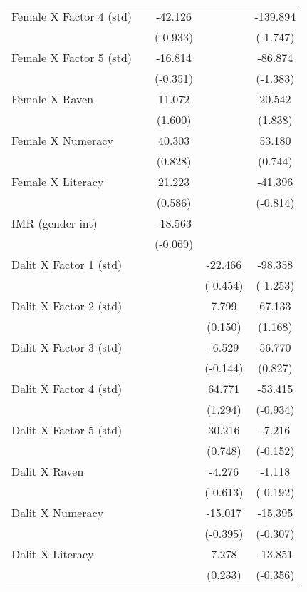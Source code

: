 \begin{table}[htbp]
{\begin{tabular}{lcccc}
    Female X Factor 4 (std) &       & -42.126 &       & -139.894 \\
          &       & (-0.933) &       & (-1.747) \\
    Female X Factor 5 (std) &       & -16.814 &       & -86.874 \\
          &       & (-0.351) &       & (-1.383) \\
    Female X Raven &       & 11.072 &       & 20.542 \\
          &       & (1.600) &       & (1.838) \\
    Female X Numeracy &       & 40.303 &       & 53.180 \\
          &       & (0.828) &       & (0.744) \\
    Female X Literacy &       & 21.223 &       & -41.396 \\
          &       & (0.586) &       & (-0.814) \\
    IMR (gender int) &       & -18.563 &       &  \\
          &       & (-0.069) &       &  \\
    Dalit X Factor 1 (std) &       &       & -22.466 & -98.358 \\
          &       &       & (-0.454) & (-1.253) \\
    Dalit X Factor 2 (std) &       &       & 7.799 & 67.133 \\
          &       &       & (0.150) & (1.168) \\
    Dalit X Factor 3 (std) &       &       & -6.529 & 56.770 \\
          &       &       & (-0.144) & (0.827) \\
    Dalit X Factor 4 (std) &       &       & 64.771 & -53.415 \\
          &       &       & (1.294) & (-0.934) \\
    Dalit X Factor 5 (std) &       &       & 30.216 & -7.216 \\
          &       &       & (0.748) & (-0.152) \\
    Dalit X Raven &       &       & -4.276 & -1.118 \\
          &       &       & (-0.613) & (-0.192) \\
    Dalit X Numeracy &       &       & -15.017 & -15.395 \\
          &       &       & (-0.395) & (-0.307) \\
    Dalit X Literacy &       &       & 7.278 & -13.851 \\
          &       &       & (0.233) & (-0.356) \\

\end{tabular}}
\end{table}
